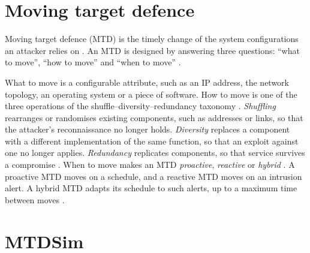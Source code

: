\documentclass{cshonours}
\begin{document}
\section{Moving target defence}
\label{sec:mtd-concept}

Moving target defence (MTD) is the timely change of the system
configurations an attacker relies on \citep{cho2020}. An MTD is designed by
answering three questions: ``what to move'', ``how to move'' and
``when to move'' \citep{cho2020}.

What to move is a configurable
attribute, such as an IP address, the network topology, an operating system
or a piece of software. How to move is one of the three operations of the
shuffle--diversity--redundancy taxonomy \citep{hongkim2016}.
\emph{Shuffling} rearranges or randomises existing components, such as
addresses or links, so that the attacker's reconnaissance no longer holds.
\emph{Diversity} replaces a component with a different implementation of
the same function, so that an exploit against one no longer applies.
\emph{Redundancy} replicates components, so that service survives a
compromise \citep{cho2020}.
When to move makes an MTD \emph{proactive}, \emph{reactive} or \emph{hybrid} \citep{cho2020}. A proactive MTD moves on a
schedule, and a reactive MTD moves on an intrusion alert. A hybrid MTD adapts its schedule to such alerts,
up to a maximum time between moves \citep{cho2020}.

\section{MTDSim}
\label{sec:mtdsim}
\end{document}
